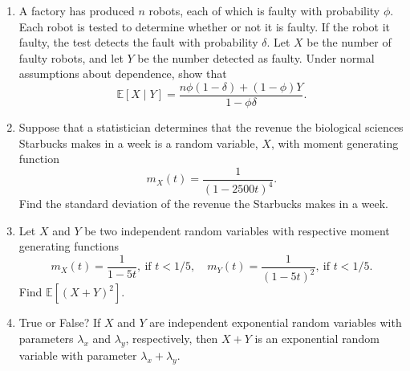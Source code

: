 \documentclass[11pt,letterpaper]{article}
\newcommand{\E}{\mathbb{E}}
\begin{document}
\begin{enumerate}
	\vfill\pagebreak

	\item A factory has produced $n$ robots, each of which is faulty with probability $\phi$. Each robot is tested to determine whether or not it is faulty. If the robot it faulty, the test detects the fault with probability $\delta$. Let $X$ be the number of faulty robots, and let $Y$ be the number detected as faulty. Under normal assumptions about dependence, show that
	\[
		\E[X\mid Y] = \frac{n\phi(1-\delta) + (1-\phi)Y}{1-\phi\delta}.
	\]
	\vfill

	\item Suppose that a statistician determines that the revenue the biological sciences Starbucks makes in a week is a random variable, $X$, with moment generating function
	\[
		m_X(t) = \frac{1}{(1-2500t)^4}.
	\]
	Find the standard deviation of the revenue the Starbucks makes in a week.

	\vfill

	\item Let $X$ and $Y$ be two independent random variables with respective moment generating functions
	\[
		m_X(t) = \frac{1}{1-5t},\ \text{if }t<1/5,\quad m_Y(t) = \frac{1}{(1-5t)^2},\ \text{if }t<1/5.
	\]
	Find $\E[(X+Y)^2]$.

	\vfill

	\item True or False? If $X$ and $Y$ are independent exponential random variables with parameters $\lambda_x$ and $\lambda_y$, respectively, then $X+Y$ is an exponential random variable with parameter $\lambda_x + \lambda_y$.
	\vfill
\end{enumerate}
\end{document}

